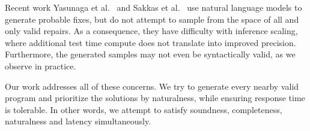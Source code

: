 Recent work Yasunaga et al.~\cite{yasunaga2021break} and Sakkas et al.~\cite{sakkas2022seq2parse} use natural language models to generate probable fixes, but do not attempt to sample from the space of all and only valid repairs. As a consequence, they have difficulty with inference scaling, where additional test time compute does not translate into improved precision. Furthermore, the generated samples may not even be syntactically valid, as we observe in practice.

Our work addresses all of these concerns. We try to generate every nearby valid program and prioritize the solutions by naturalness, while ensuring response time is tolerable. In other words, we attempt to satisfy soundness, completeness, naturalness and latency simultaneously.


\clearpage